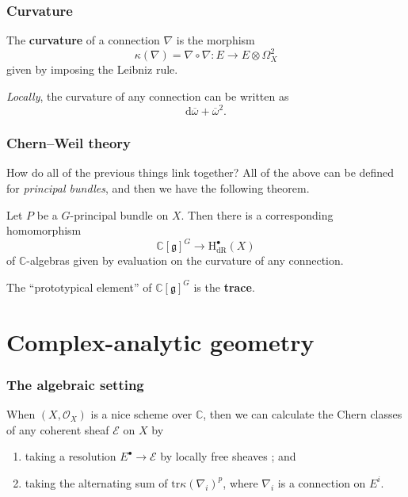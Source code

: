 \documentclass{beamer}
\begin{document}
  \begin{frame}\frametitle{Curvature}
    \begin{definition}
      The \textbf{curvature} of a connection $\nabla$ is the morphism
      \[
        \kappa(\nabla) = \nabla\circ\nabla
        \colon E \to E\otimes\Omega_X^2
      \]
      given by imposing the Leibniz rule.
    \end{definition}

    \pause

    \begin{lemma}
      \emph{Locally}, the curvature of any connection can be written as
      \[
        \mathrm{d}\overline{\omega} + \overline{\omega}^2.
      \]
    \end{lemma}
  \end{frame}

  \begin{frame}\frametitle{Chern--Weil theory}
    How do all of the previous things link together?
    All of the above can be defined for \emph{principal bundles}, and then we have the following theorem.

    \pause

    \begin{theorem}
      Let $P$ be a $G$-principal bundle on $X$.
      Then there is a corresponding homomorphism
      \[
        \mathbb{C}[\mathfrak{g}]^G
        \to \mathrm{H}_\mathrm{dR}^\bullet(X)
      \]
      of $\mathbb{C}$-algebras given by evaluation on the curvature of any connection.
    \end{theorem}

    The ``prototypical element'' of $\mathbb{C}[\mathfrak{g}]^G$ is the \textbf{trace}.
  \end{frame}


\section{Complex-analytic geometry}

  \begin{frame}\frametitle{The algebraic setting}
    When $(X,\mathcal{O}_X)$ is a nice scheme over $\mathbb{C}$, then we can calculate the Chern classes of any coherent sheaf $\mathscr{E}$ on $X$ by
    \begin{enumerate}
      \item taking a resolution $E^\bullet\to\mathscr{E}$ by locally free sheaves ; and
      \item taking the alternating sum of $\mathrm{tr}\kappa(\nabla_i)^p$, where $\nabla_i$ is a connection on $E^i$.
    \end{enumerate}
  \end{frame}
\end{document}

